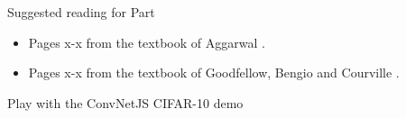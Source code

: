 
\begin{frame}{Suggested reading for Part \thispart}

\begin{itemize}
    \small
    \item Pages x-x from the textbook of Aggarwal \cite{Aggarwal:2018SpringerDL}.
    \item Pages x-x from the textbook of Goodfellow, Bengio and Courville \cite{Goodfellow:2017MITDL}.
\end{itemize}

Play with the ConvNetJS CIFAR-10 demo \cite{Demo:ConvNetJSCIFAR10}
\end{frame}